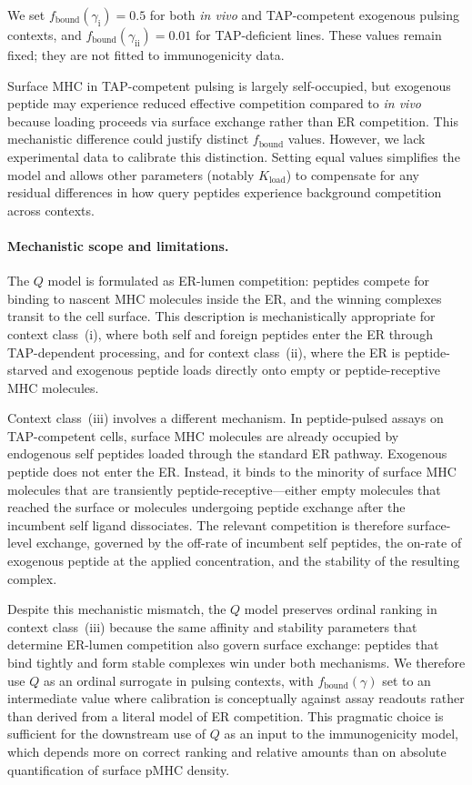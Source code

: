 \documentclass[11pt]{article}
\begin{document}
We set \(f_{\mathrm{bound}}(\gamma_{\mathrm{i}})=0.5\) for both \textit{in vivo} and TAP-competent exogenous pulsing contexts, and \(f_{\mathrm{bound}}(\gamma_{\mathrm{ii}})=0.01\) for TAP-deficient lines. These values remain fixed; they are not fitted to immunogenicity data.

Surface MHC in TAP-competent pulsing is largely self-occupied, but exogenous peptide may experience reduced effective competition compared to \textit{in vivo} because loading proceeds via surface exchange rather than ER competition. This mechanistic difference could justify distinct \(f_{\mathrm{bound}}\) values. However, we lack experimental data to calibrate this distinction. Setting equal values simplifies the model and allows other parameters (notably \(K_{\mathrm{load}}\)) to compensate for any residual differences in how query peptides experience background competition across contexts.

\paragraph{Mechanistic scope and limitations.}
The \(Q\) model is formulated as ER-lumen competition: peptides compete for binding to nascent MHC molecules inside the ER, and the winning complexes transit to the cell surface. This description is mechanistically appropriate for context class~(i), where both self and foreign peptides enter the ER through TAP-dependent processing, and for context class~(ii), where the ER is peptide-starved and exogenous peptide loads directly onto empty or peptide-receptive MHC molecules.

Context class~(iii) involves a different mechanism. In peptide-pulsed assays on TAP-competent cells, surface MHC molecules are already occupied by endogenous self peptides loaded through the standard ER pathway. Exogenous peptide does not enter the ER. Instead, it binds to the minority of surface MHC molecules that are transiently peptide-receptive---either empty molecules that reached the surface or molecules undergoing peptide exchange after the incumbent self ligand dissociates. The relevant competition is therefore surface-level exchange, governed by the off-rate of incumbent self peptides, the on-rate of exogenous peptide at the applied concentration, and the stability of the resulting complex.

Despite this mechanistic mismatch, the \(Q\) model preserves ordinal ranking in context class~(iii) because the same affinity and stability parameters that determine ER-lumen competition also govern surface exchange: peptides that bind tightly and form stable complexes win under both mechanisms. We therefore use \(Q\) as an ordinal surrogate in pulsing contexts, with \(f_{\mathrm{bound}}(\gamma)\) set to an intermediate value where calibration is conceptually against assay readouts rather than derived from a literal model of ER competition. This pragmatic choice is sufficient for the downstream use of \(Q\) as an input to the immunogenicity model, which depends more on correct ranking and relative amounts than on absolute quantification of surface pMHC density.
\end{document}
